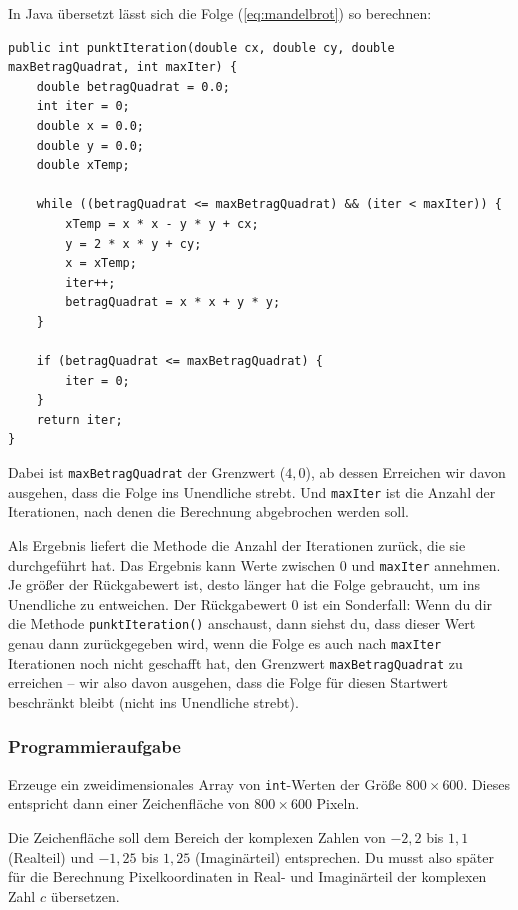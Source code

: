 In Java übersetzt lässt sich die Folge (\ref{eq:mandelbrot}) so berechnen:

\begin{lstlisting}
public int punktIteration(double cx, double cy, double maxBetragQuadrat, int maxIter) { 
    double betragQuadrat = 0.0;
    int iter = 0;
    double x = 0.0;
    double y = 0.0;
    double xTemp;

    while ((betragQuadrat <= maxBetragQuadrat) && (iter < maxIter)) {
        xTemp = x * x - y * y + cx;
        y = 2 * x * y + cy;
        x = xTemp;
        iter++;
        betragQuadrat = x * x + y * y;
    }

    if (betragQuadrat <= maxBetragQuadrat) {
        iter = 0;
    }
    return iter;
}
\end{lstlisting}

Dabei ist \lstinline|maxBetragQuadrat| der Grenzwert ($4{,}0$), ab dessen Erreichen wir
davon ausgehen, dass die Folge ins Unendliche strebt. Und \lstinline|maxIter|
ist die Anzahl der Iterationen, nach denen die Berechnung abgebrochen werden
soll.

Als Ergebnis liefert die Methode die Anzahl der Iterationen zurück, die sie
durchgeführt hat. Das Ergebnis kann Werte zwischen $0$ und \lstinline|maxIter|
annehmen. Je größer der Rückgabewert ist, desto länger hat die Folge gebraucht,
um ins Unendliche zu entweichen. Der Rückgabewert $0$ ist ein Sonderfall: Wenn du
dir die Methode \lstinline|punktIteration()| anschaust, dann siehst du, dass
dieser Wert genau dann zurückgegeben wird, wenn die Folge es auch nach
\lstinline|maxIter| Iterationen noch nicht geschafft hat, den Grenzwert
\lstinline|maxBetragQuadrat| zu erreichen -- wir also davon ausgehen, dass die
Folge für diesen Startwert beschränkt bleibt (nicht ins Unendliche strebt).


\subsubsection{Programmieraufgabe}

Erzeuge ein zweidimensionales Array von \lstinline|int|-Werten der Größe $800 \times 600$.
Dieses entspricht dann einer Zeichenfläche von $800 \times 600$ Pixeln.

Die Zeichenfläche soll dem Bereich der komplexen Zahlen von $-2{,}2$ bis $1{,}1$
(Realteil) und $-1{,}25$ bis $1{,}25$ (Imaginärteil) entsprechen. Du musst also später
für die Berechnung Pixelkoordinaten in Real- und Imaginärteil der komplexen Zahl
$c$ \glqq übersetzen\grqq .

